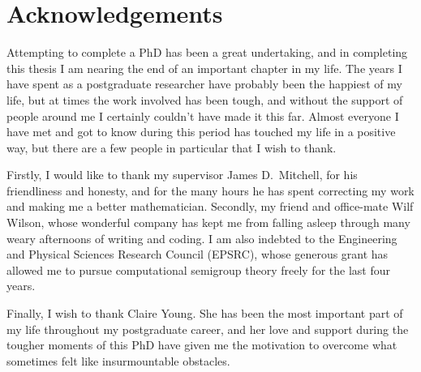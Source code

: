\chapter*{Acknowledgements}

Attempting to complete a PhD has been a great undertaking, and in completing
this thesis I am nearing the end of an important chapter in my life.  The years
I have spent as a postgraduate researcher have probably been the happiest of my
life, but at times the work involved has been tough, and without the support of
people around me I certainly couldn't have made it this far.  Almost everyone I
have met and got to know during this period has touched my life in a positive
way, but there are a few people in particular that I wish to thank.

Firstly, I would like to thank my supervisor James D.~Mitchell, for his
friendliness and honesty, and for the many hours he has spent correcting my work
and making me a better mathematician.  Secondly, my friend and office-mate Wilf
Wilson, whose wonderful company has kept me from falling asleep through many
weary afternoons of writing and coding.  I am also indebted to the Engineering
and Physical Sciences Research Council (EPSRC), whose generous grant has allowed
me to pursue computational semigroup theory freely for the last four years.

Finally, I wish to thank Claire Young.  She has been the most important part of
my life throughout my postgraduate career, and her love and support during the
tougher moments of this PhD have given me the motivation to overcome what
sometimes felt like insurmountable obstacles.

